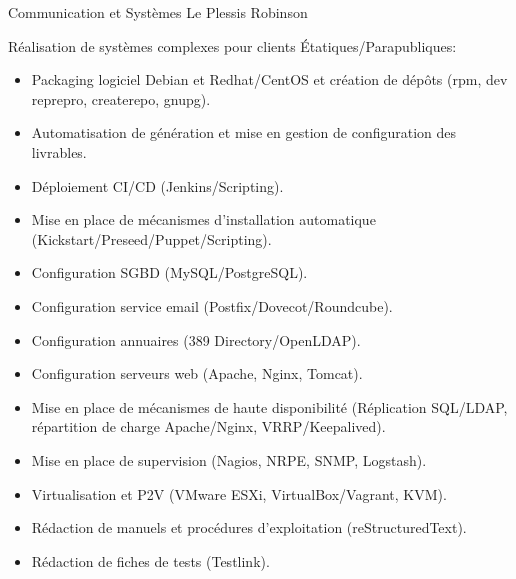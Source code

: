 \documentclass[10pt,a4paper,sans]{moderncv}
\begin{document}
        {Communication et Systèmes}
        {Le Plessis Robinson}
        {}
        {Réalisation de systèmes complexes pour clients Étatiques/Parapubliques:
            \begin{itemize}
            \item Packaging logiciel Debian et Redhat/CentOS et création de dépôts (rpm, dev reprepro, createrepo, gnupg).
            \item Automatisation de génération et mise en gestion de configuration des livrables.
            \item Déploiement CI/CD (Jenkins/Scripting).
            \item Mise en place de mécanismes d'installation automatique (Kickstart/Preseed/Puppet/Scripting).
            \item Configuration SGBD (MySQL/PostgreSQL).
            \item Configuration service email (Postfix/Dovecot/Roundcube).
            \item Configuration annuaires (389 Directory/OpenLDAP).
            \item Configuration serveurs web (Apache, Nginx, Tomcat).
            \item Mise en place de mécanismes de haute disponibilité (Réplication SQL/LDAP, répartition de charge Apache/Nginx, VRRP/Keepalived).
            \item Mise en place de supervision (Nagios, NRPE, SNMP, Logstash).
            \item Virtualisation et P2V (VMware ESXi, VirtualBox/Vagrant, KVM).
            \item Rédaction de manuels et procédures d'exploitation (reStructuredText).
            \item Rédaction de fiches de tests (Testlink).
            \end{itemize}
        }
\end{document}
